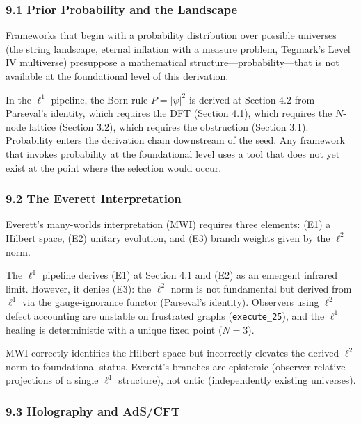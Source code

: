 \documentclass[
]{article}
\begin{document}
\hypertarget{prior-probability-and-the-landscape}{%
\subsubsection{9.1 Prior Probability and the
Landscape}\label{prior-probability-and-the-landscape}}

Frameworks that begin with a probability distribution over possible
universes (the string landscape, eternal inflation with a measure
problem, Tegmark's Level IV multiverse) presuppose a mathematical
structure---probability---that is not available at the foundational
level of this derivation.

In the \(\ell^1\) pipeline, the Born rule \(P = |\psi|^2\) is derived at
Section 4.2 from Parseval's identity, which requires the DFT (Section
4.1), which requires the \(N\)-node lattice (Section 3.2), which
requires the obstruction (Section 3.1). Probability enters the
derivation chain downstream of the seed. Any framework that invokes
probability at the foundational level uses a tool that does not yet
exist at the point where the selection would occur.

\hypertarget{the-everett-interpretation}{%
\subsubsection{9.2 The Everett
Interpretation}\label{the-everett-interpretation}}

Everett's many-worlds interpretation (MWI) requires three elements: (E1)
a Hilbert space, (E2) unitary evolution, and (E3) branch weights given
by the \(\ell^2\) norm.

The \(\ell^1\) pipeline derives (E1) at Section 4.1 and (E2) as an
emergent infrared limit. However, it denies (E3): the \(\ell^2\) norm is
not fundamental but derived from \(\ell^1\) via the gauge-ignorance
functor (Parseval's identity). Observers using \(\ell^2\) defect
accounting are unstable on frustrated graphs (\texttt{execute\_25}), and
the \(\ell^1\) healing is deterministic with a unique fixed point
(\(N = 3\)).

MWI correctly identifies the Hilbert space but incorrectly elevates the
derived \(\ell^2\) norm to foundational status. Everett's branches are
epistemic (observer-relative projections of a single \(\ell^1\)
structure), not ontic (independently existing universes).

\hypertarget{holography-and-adscft}{%
\subsubsection{9.3 Holography and AdS/CFT}\label{holography-and-adscft}}
\end{document}
